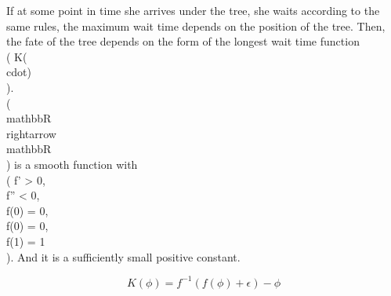If at some point in time she arrives under the tree, she waits according to the same rules, the maximum wait time depends on the position of the tree. Then, the fate of the tree depends on the form of the longest wait time function \\( K(\\cdot) \\). \\( \\mathbb{R} \\rightarrow \\mathbb{R} \\) is a smooth function with \\( f' > 0, \\ f'' < 0, \\ f(0) = 0, \\ f(0) = 0, \\ f(1) = 1 \\). And it is a sufficiently small positive constant.

$$K(\phi) = f^{-1}(f(\phi) + \epsilon) - \phi$$
